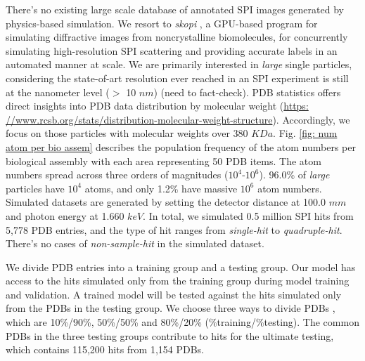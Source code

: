 There's no existing large scale database of annotated SPI images generated by
physics-based simulation.  We resort to \textit{skopi}
\cite{peckSkopiSimulationPackage2022}, a GPU-based program for simulating
diffractive images from noncrystalline biomolecules, for concurrently simulating
high-resolution SPI scattering and providing accurate labels in an automated
manner at scale.  We are primarily interested in \textit{large} single particles,
considering the state-of-art resolution ever reached in an SPI experiment is
still at the nanometer level ($>$ 10 $nm$) {\color{red} (need to fact-check)}.
PDB statistics offers direct insights into PDB data distribution by molecular
weight (\url{https:
//www.rcsb.org/stats/distribution-molecular-weight-structure}).  Accordingly, we
focus on those particles with molecular weights over 380 $KDa$.  Fig.  \ref{fig:
num atom per bio assem} describes the population frequency of the atom numbers
per biological assembly with each area representing 50 PDB items.  The atom
numbers spread across three orders of magnitudes ($10^4\text{-}10^6$).  96.0\%
of \textit{large} particles have $10^4$ atoms, and only 1.2\% have massive
$10^6$ atom numbers. Simulated datasets are generated by setting the detector
distance at 100.0 $mm$ and photon energy at 1.660 $keV$.  In total, we simulated
0.5 million SPI hits from 5,778 PDB entries, and the type of hit ranges from
\textit{single-hit} to \textit{quadruple-hit}.  There's no cases of
\textit{non-sample-hit} in the simulated dataset.

We divide PDB entries into a training group and a testing group.  Our model has
access to the hits simulated only from the training group during model training
and validation.  A trained model will be tested against the hits simulated only
from the PDBs in the testing group.  We choose three ways to divide PDBs
, which are 10\%/90\%, 50\%/50\% and 80\%/20\% (\%training/\%testing).
The common PDBs in the three testing groups contribute to hits for the ultimate
testing, which contains 115,200 hits from 1,154 PDBs.  

